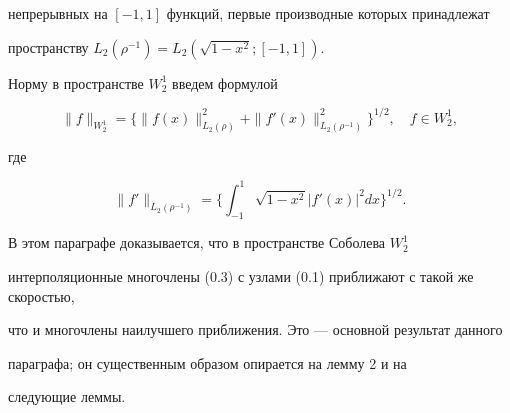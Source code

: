 непрерывных на $[-1,1]$ функций, первые производные которых принадлежат 


пространству $L_2(\rho^{-1})=L_2(\sqrt{1-x^2};[-1,1])$.


Норму в пространстве $W_2^1$ введем формулой


$$


\|f\|_{W_2^1}=\{\|f(x)\|^2_{L_2(\rho)}+\|f'(x)\|^2_{L_2(\rho^{-1})}\}^{1/2},


\quad f\in W_2^1,


$$


где


$$


\|f'\|_{L_2(\rho^{-1})}=\bigg\{\int_{-1}^1\sqrt{1-x^2}|f'(x)|^2dx


\bigg\}^{1/2}.


$$





В этом параграфе доказывается, что в пространстве Соболева $W_2^1$ 


интерполяционные многочлены (0.3) с узлами (0.1) приближают с такой же скоростью, 


что и многочлены наилучшего приближения. Это --- основной результат данного 


параграфа; он существенным образом опирается на лемму 2 и на 


следующие леммы.








